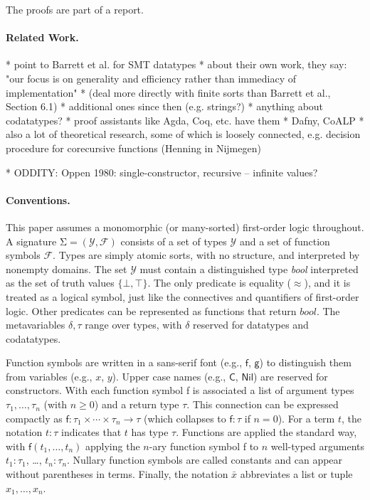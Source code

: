 \documentclass[a4paper,oribibl,envcountsame,draft]{llncs}
\newcommand\Sig{\mathrm{\Sigma}}
\newcommand\const[1]{\textsf{#1}}
\newcommand\ty[1]{\textit{#1}}
\newcommand{\teq}{\approx}
\newcommand\Types{\mathcal{Y}}
\newcommand\Funcs{\mathcal{F}}
\begin{document}
The proofs are part of a report.

\paragraph{Related Work.}

    * point to Barrett et al. for SMT datatypes
      * about their own work, they say: "our focus is on generality and
        efficiency rather than immediacy of implementation"
      * (deal more directly with finite sorts than Barrett et al., Section 6.1)
    * additional ones since then (e.g. strings?)
    * anything about codatatypes?
      * proof assistants like Agda, Coq, etc. have them
      * Dafny, CoALP
      * also a lot of theoretical research, some of which is loosely connected,
        e.g. decision procedure for corecursive functions (Henning in Nijmegen)

    * ODDITY: Oppen 1980: single-constructor, recursive -- infinite values?

\paragraph{Conventions.}
This paper assumes a monomorphic (or many-sorted) first-order logic throughout.
A signature $\Sig = (\Types, \Funcs)$ consists of a set of types $\Types$ and a
set of function symbols $\Funcs$. Types are simply atomic sorts, with no
structure, and interpreted by nonempty domains. The set $\Types$ must contain a
distinguished type \ty{bool} interpreted as the set of truth
values $\{\bot, \top\}$. %
The only predicate is equality ($\teq$), and it is treated as a logical symbol,
just like the connectives and quantifiers of first-order logic.
Other predicates can be represented as functions that return $\ty{bool}$.
The metavariables $\delta, \tau$ range over types, with $\delta$ reserved
for datatypes and codatatypes.

Function symbols are written in a sans-serif font (e.g., $\const{f}$, $\const{g}$) to
distinguish them from variables (e.g., $x$, $y$). Upper case names (e.g., $\const{C}$,
$\const{Nil}$) are reserved for constructors. With each function symbol \const{f}
is associated a list of argument types $\tau_1,\ldots,\tau_n$ (with $n \ge 0$)
and a return type $\tau$. This connection can be expressed compactly as
$\const{f} : \tau_1 \times \cdots \times \tau_n \to \tau$
(which collapses to $\const{f} : \tau$ if $n = 0$).
For a term $t$, the notation $t : \tau$ indicates that $t$ has type $\tau$.
Functions are applied the standard way, with $\const{f}(t_1,\ldots,t_n)$
applying the $n$-ary function symbol
\const{f} to $n$ well-typed arguments $t_1 : \tau_1$, \ldots, $t_n :
\tau_n$. Nullary function symbols are called constants and can appear without
parentheses in terms.
%
Finally, the notation $\bar x$ abbreviates a list or tuple $x_1,\ldots,x_n$.
\end{document}
